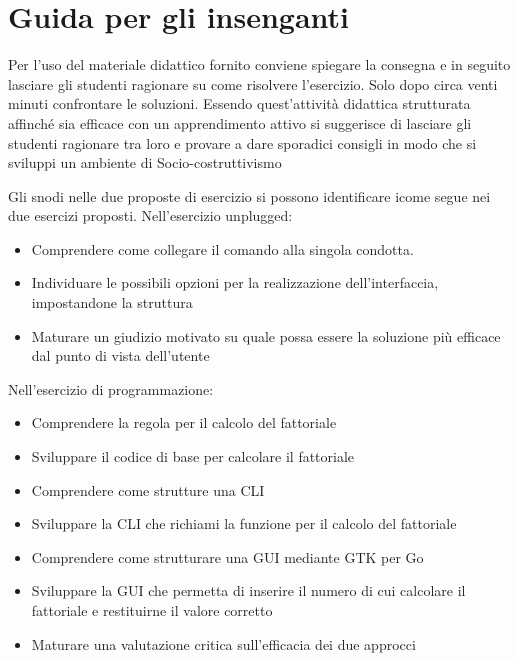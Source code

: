 \section{Guida per gli insenganti}
Per l'uso del materiale didattico fornito conviene spiegare la consegna e in seguito lasciare gli studenti ragionare su come risolvere l'esercizio. Solo dopo circa venti  minuti confrontare le soluzioni. Essendo quest'attività didattica strutturata affinché sia efficace con un apprendimento attivo si suggerisce di lasciare gli studenti ragionare tra loro e provare a dare sporadici consigli in modo che si sviluppi un ambiente di Socio-costruttivismo

Gli snodi nelle due proposte di esercizio si possono identificare icome segue nei due esercizi proposti. 
Nell'esercizio unplugged:
\begin{itemize}
\item Comprendere come collegare il comando alla singola condotta.
\item Individuare le possibili opzioni per la realizzazione dell'interfaccia, impostandone la struttura
\item Maturare un giudizio motivato su quale possa essere la soluzione più efficace dal punto di vista dell'utente
\end{itemize}

Nell'esercizio di programmazione:
\begin{itemize}
\item Comprendere la regola per il calcolo del fattoriale
\item Sviluppare il codice di base per calcolare il fattoriale
\item Comprendere come strutture una CLI 
\item Sviluppare la CLI che richiami la funzione per il calcolo del fattoriale
\item Comprendere come strutturare una GUI mediante GTK per Go
\item Sviluppare la GUI che permetta di inserire il numero di cui calcolare il fattoriale e restituirne il valore corretto
\item Maturare una valutazione critica sull'efficacia dei due approcci
\end{itemize}
